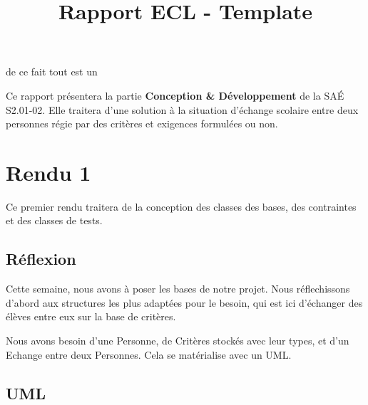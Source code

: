 \documentclass{mytex}
\title{Rapport ECL - Template} %
\begin{document}

de ce fait tout est un


        
\fairemarges %
\fairepagedegarde %
\tabledematieres %


Ce rapport présentera la partie \textbf{Conception \& Développement} de la SAÉ S2.01-02. Elle traitera d'une solution à la situation d'échange scolaire entre deux personnes régie par des critères et exigences formulées ou non.

\section{Rendu 1}

Ce premier rendu traitera de la conception des classes des bases, des contraintes et des classes de tests.

\subsection{Réflexion}

Cette semaine, nous avons à poser les bases de notre projet.
Nous réflechissons d'abord aux structures les plus adaptées pour le besoin, qui est ici d'échanger des élèves entre eux sur la base de critères.

Nous avons besoin d'une Personne, de Critères stockés avec leur types, et d'un Echange entre deux Personnes.
Cela se matérialise avec un UML.

\subsection{UML}

\end{document}
